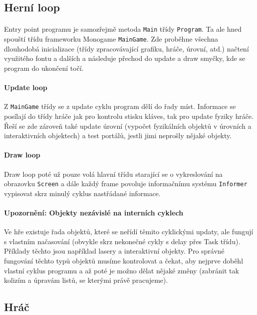 \documentclass[a4paper, 12pt]{article}
\begin{document}
\subsection{Herní loop}
\paragraph{}
Entry point programu je samozřejmě metoda \texttt{Main} třídy
\texttt{Program}. Ta ale hned spouští třídu frameworku Monogame
\texttt{MainGame}. Zde proběhne všechna dlouhodobá inicializace (třídy zpracovávající 
grafiku, hráče, úrovní, atd.) načtení využitého fontu a dalších a následuje 
přechod do update a draw smyčky, kde se program do ukončení točí. 

\paragraph{Update loop}
Z \texttt{MainGame} třídy se z update cyklu program dělí do řady míst.
Informace se posílají do třídy hráče jak pro kontrolu stisku kláves, tak pro update fyziky hráče. Řeší
se zde zároveň také update úrovní (vypočet fyzikálních objektů v úrovních a
interaktivních objektech) a test portálů, jestli jimi neprošly nějaké objekty.

\paragraph{Draw loop}
Draw loop poté už pouze volá hlavní třídu starající se o vykreslování na
obrazovku \texttt{Screen} a dále každý frame povoluje informačnímu systému
\texttt{Informer} vypisovat skrz minulý cyklus nastřádané informace.

\paragraph{Upozornění: Objekty nezávislé na interních cyklech}
Ve hře existuje řada objektů, které se neřídí těmito cyklickými updaty, ale
fungují s vlastním načasování (obvykle skrz nekonečné cykly s delay přes Task
třídu). Příklady těchto jsou například lasery a interaktivní objekty. Pro
správné fungování těchto typů objektů musíme kontrolovat a čekat, aby nejprve
doběhl vlastní cyklus programu a až poté je možno dělat nějaké změny (zabránit
tak kolizím a úpravám listů, se kterými právě pracujeme).

\subsection{Hráč}
\end{document}

